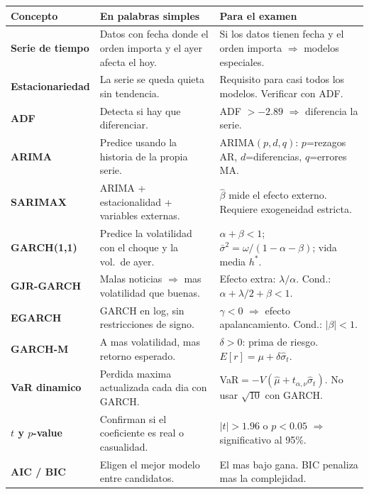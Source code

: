 \documentclass[12pt,a4paper]{article}
\begin{document}
\begin{center}
\renewcommand{\arraystretch}{1.45}
\begin{tabular}{>{\bfseries}p{3cm} p{5.5cm} p{5.5cm}}
  \toprule
  Concepto & En palabras simples & Para el examen \\
  \midrule
  Serie de tiempo
    & Datos con fecha donde el orden importa y el ayer afecta el hoy.
    & Si los datos tienen fecha y el orden importa $\Rightarrow$ modelos especiales. \\

  Estacionariedad
    & La serie se queda quieta sin tendencia.
    & Requisito para casi todos los modelos. Verificar con ADF. \\

  ADF
    & Detecta si hay que diferenciar.
    & ADF $> -2.89$ $\Rightarrow$ diferencia la serie. \\

  ARIMA
    & Predice usando la historia de la propia serie.
    & ARIMA$(p,d,q)$: $p$=rezagos AR, $d$=diferencias, $q$=errores MA. \\

  SARIMAX
    & ARIMA + estacionalidad + variables externas.
    & $\hat{\beta}$ mide el efecto externo. Requiere exogeneidad estricta. \\

  GARCH(1,1)
    & Predice la volatilidad con el choque y la vol.\ de ayer.
    & $\alpha+\beta<1$; $\bar{\sigma}^2=\omega/(1{-}\alpha{-}\beta)$; vida media $h^*$. \\

  GJR-GARCH
    & Malas noticias $\Rightarrow$ mas volatilidad que buenas.
    & Efecto extra: $\lambda/\alpha$. Cond.: $\alpha+\lambda/2+\beta<1$. \\

  EGARCH
    & GARCH en log, sin restricciones de signo.
    & $\gamma<0$ $\Rightarrow$ efecto apalancamiento. Cond.: $|\beta|<1$. \\

  GARCH-M
    & A mas volatilidad, mas retorno esperado.
    & $\delta>0$: prima de riesgo. $E[r]=\mu+\delta\hat{\sigma}_t$. \\

  VaR dinamico
    & Perdida maxima actualizada cada dia con GARCH.
    & VaR$=-V(\hat{\mu}+t_{\alpha,\nu}\hat{\sigma}_t)$. No usar $\sqrt{10}$ con GARCH. \\

  $t$ y $p$-value
    & Confirman si el coeficiente es real o casualidad.
    & $|t|>1.96$ o $p<0.05$ $\Rightarrow$ significativo al 95\%. \\

  AIC / BIC
    & Eligen el mejor modelo entre candidatos.
    & El mas bajo gana. BIC penaliza mas la complejidad. \\
  \bottomrule
\end{tabular}
\end{center}
\end{document}
